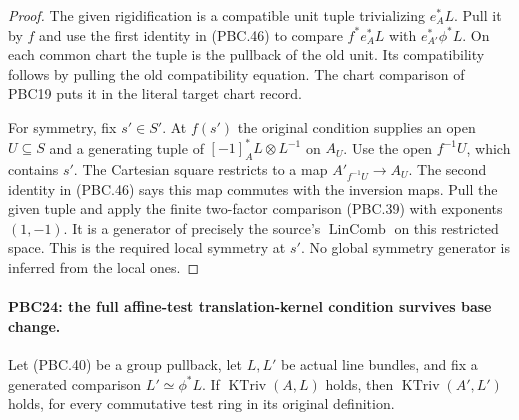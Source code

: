 \begin{proof}
The given rigidification is a compatible unit tuple
trivializing $e_A^*L$.  Pull it by $f$ and use the first
identity in (PBC.46) to compare
$f^*e_A^*L$ with $e_{A'}^*\phi^*L$.
On each common chart the tuple is the pullback of the old
unit.  Its compatibility follows by pulling the old
compatibility equation.  The chart comparison of PBC19
puts it in the literal target chart record.

For symmetry, fix $s'\in S'$.  At $f(s')$ the original
condition supplies an open $U\subseteq S$ and a
generating tuple of
$[-1]_A^*L\otimes L^{-1}$ on $A_U$.
Use the open $f^{-1}U$, which contains $s'$.
The Cartesian square restricts to a map
$A'_{f^{-1}U}\to A_U$.
The second identity in (PBC.46) says this map commutes
with the inversion maps.  Pull the given tuple and
apply the finite two-factor comparison (PBC.39) with
exponents $(1,-1)$.  It is a generator of precisely the
source's $\operatorname{LinComb}$ on this restricted
space.  This is the required local symmetry at $s'$.
No global symmetry generator is inferred from the local ones.
\end{proof}

\paragraph{PBC24: the full affine-test translation-kernel condition survives base change.}
\label{claim:PBC24}
Let (PBC.40) be a group pullback, let $L,L'$ be actual
line bundles, and fix a generated comparison
$L'\simeq\phi^*L$.
If $\operatorname{KTriv}(A,L)$ holds, then
$\operatorname{KTriv}(A',L')$ holds, for every commutative
test ring in its original definition.

